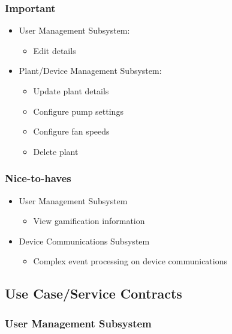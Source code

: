 \documentclass{article}
\begin{document}
		\subsubsection{Important}
			\begin{itemize}
				\item User Management Subsystem:
				\begin{itemize}
					\item Edit details
				\end{itemize}
				
				\item Plant/Device Management Subsystem:
				\begin{itemize}
					\item Update plant details
					\item Configure pump settings
					\item Configure fan speeds
					\item Delete plant
				\end{itemize}
			\end{itemize}
			
		\subsubsection{Nice-to-haves}
			\begin{itemize}
				\item User Management Subsystem
					\begin{itemize}
						\item View gamification information
					\end{itemize}
				\item Device Communications Subsystem
					\begin{itemize}
						\item Complex event processing on device communications
					\end{itemize}
			\end{itemize}

\subsection{Use Case/Service Contracts}

\subsubsection{User Management Subsystem}
\end{document}

